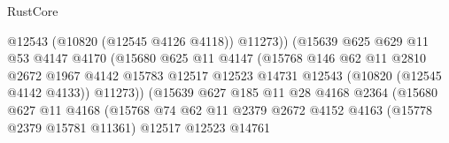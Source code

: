 \begin{lexlean}{RustCore}
\begin{coremodule}
                                          @12543
                                          (@10820 (@12545 @4126 @4118))
                                          @11273))
                                      (@15639
                                        @625
                                        @629
                                        @11
                                        @53
                                        @4147
                                        @4170
                                        (@15680
                                          @625
                                          @11
                                          @4147
                                          (@15768
                                            @146
                                            @62
                                            @11
                                            @2810
                                            @2672
                                            @1967
                                            @4142
                                            @15783
                                            @12517
                                            @12523
                                            @14731
                                            @12543
                                            (@10820 (@12545 @4142 @4133))
                                            @11273))
                                        (@15639
                                          @627
                                          @185
                                          @11
                                          @28
                                          @4168
                                          @2364
                                          (@15680
                                            @627
                                            @11
                                            @4168
                                            (@15768
                                              @74
                                              @62
                                              @11
                                              @2379
                                              @2672
                                              @4152
                                              @4163
                                              (@15778 @2379 @15781 @11361)
                                              @12517
                                              @12523
                                              @14761

\end{coremodule}
\end{lexlean}
